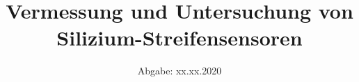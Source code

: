 

\subject{Lehrstuhlversuch im SS2020}
\title{Vermessung und Untersuchung von Silizium-Streifensensoren}
\date{%
  Abgabe: xx.xx.2020
}



\maketitle
\thispagestyle{empty}
\tableofcontents
\newpage








%


